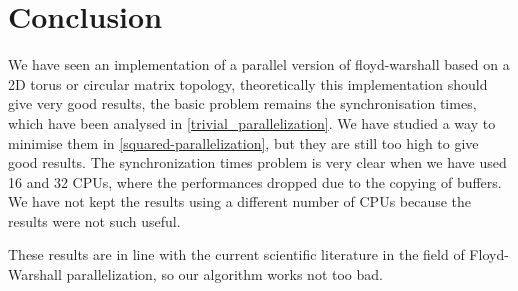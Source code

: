 \section{Conclusion}
We have seen an implementation of a parallel version of floyd-warshall based on a 2D torus or circular matrix topology, theoretically this implementation should give very good results, the basic problem remains the synchronisation times, which have been analysed in \cref{trivial_parallelization}. We have studied a way to minimise them in \cref{squared-parallelization}, but they are still too high to give good results. The synchronization times problem is very clear when we have used 16 and 32 CPUs, where the performances dropped due to the copying of buffers. We have not kept the results using a different number of CPUs because the results were not such useful.

These results are in line with the current scientific literature in the field of  Floyd-Warshall parallelization, so our algorithm works not too bad.

\FloatBarrier
